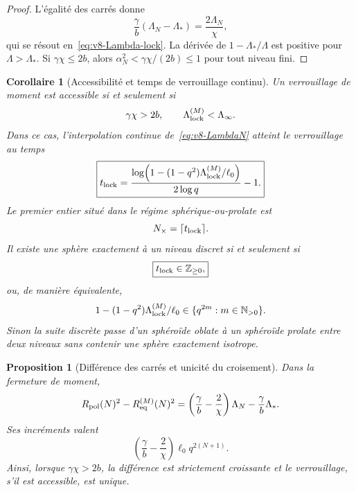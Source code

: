 \documentclass[11pt,a4paper]{article}
\newtheorem{proposition}[theorem]{Proposition}
\newtheorem{corollary}[theorem]{Corollaire}
\begin{document}
\begin{proof}
L'égalité des carrés donne
\[
 \frac{\gamma}{b}(\Lambda_N-\Lambda_*)
 =\frac{2\Lambda_N}{\chi},
\]
qui se résout en~\eqref{eq:v8-Lambda-lock}. La dérivée de
$1-\Lambda_*/\Lambda$ est positive pour $\Lambda>\Lambda_*$. Si
$\gamma\chi\le2b$, alors
$\alpha_N^2<\gamma\chi/(2b)\le1$ pour tout niveau fini.
\end{proof}

\begin{corollary}[Accessibilité et temps de verrouillage continu]\label{cor:v8-lock-time}
Un verrouillage de moment est accessible si et seulement si
\begin{equation}\label{eq:v8-lock-access}
 \gamma\chi>2b,
 \qquad
 \Lambda_{\rm lock}^{(M)}<\Lambda_\infty.
\end{equation}
Dans ce cas, l'interpolation continue de~\eqref{eq:v8-LambdaN} atteint le verrouillage au temps
\begin{equation}\label{eq:v8-tlock}
 \boxed{
 t_{\rm lock}
 =
 \frac{
 \log\!\left(
 1-(1-q^2)\Lambda_{\rm lock}^{(M)}/\ell_0
 \right)}
 {2\log q}-1.}
\end{equation}
Le premier entier situé dans le régime sphérique-ou-prolate est
\begin{equation}\label{eq:v8-Ncross}
 N_{\times}=\lceil t_{\rm lock}\rceil.
\end{equation}
Il existe une sphère \emph{exactement à un niveau discret} si et seulement si
\begin{equation}\label{eq:v8-discrete-lock-iff}
 \boxed{t_{\rm lock}\in\mathbb Z_{\ge0},}
\end{equation}
ou, de manière équivalente,
\[
 1-(1-q^2)\Lambda_{\rm lock}^{(M)}/\ell_0
 \in\{q^{2m}:m\in\mathbb N_{>0}\}.
\]
Sinon la suite discrète passe d'un sphéroïde oblate à un sphéroïde prolate entre deux niveaux sans contenir une sphère exactement isotrope.
\end{corollary}

\begin{proposition}[Différence des carrés et unicité du croisement]\label{prop:v8-lock-difference}
Dans la fermeture de moment,
\begin{equation}\label{eq:v8-lock-difference}
 R_{\rm pol}(N)^2-R_{\rm eq}^{(M)}(N)^2
 =
 \left(\frac{\gamma}{b}-\frac2\chi\right)\Lambda_N
 -\frac{\gamma}{b}\Lambda_*.
\end{equation}
Ses incréments valent
\begin{equation}\label{eq:v8-lock-diff-increment}
 \left(\frac{\gamma}{b}-\frac2\chi\right)
 \ell_0q^{2(N+1)}.
\end{equation}
Ainsi, lorsque $\gamma\chi>2b$, la différence est strictement croissante et le verrouillage, s'il est accessible, est unique.
\end{proposition}
\end{document}
